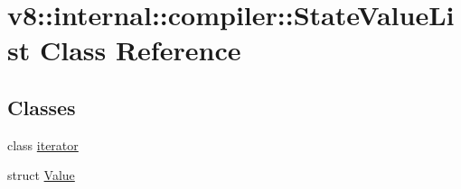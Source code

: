 \hypertarget{classv8_1_1internal_1_1compiler_1_1StateValueList}{}\section{v8\+:\+:internal\+:\+:compiler\+:\+:State\+Value\+List Class Reference}
\label{classv8_1_1internal_1_1compiler_1_1StateValueList}
\subsection*{Classes}
\begin{DoxyCompactItemize}
\item 
class \mbox{\hyperlink{classv8_1_1internal_1_1compiler_1_1StateValueList_1_1iterator}{iterator}}
\item 
struct \mbox{\hyperlink{structv8_1_1internal_1_1compiler_1_1StateValueList_1_1Value}{Value}}
\end{DoxyCompactItemize}
